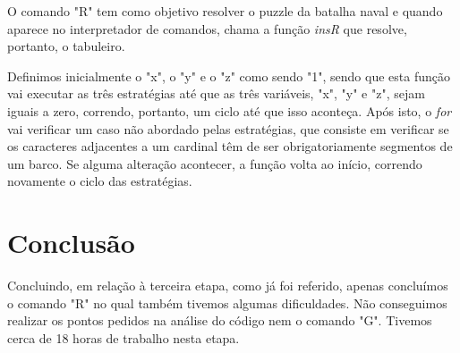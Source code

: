 \documentclass[12pt,a4paper,portuges]{article}
\begin{document}
O comando "R" tem como objetivo resolver o puzzle da batalha naval e quando aparece no interpretador de comandos, chama a função \textit{insR} que resolve, portanto, o tabuleiro.

Definimos inicialmente o "x", o "y" e o "z" como sendo "1", sendo que esta função vai executar as três estratégias até que as três variáveis, "x", "y" e "z", sejam iguais a zero, correndo, portanto, um ciclo até que isso aconteça. Após isto, o \textit{for} vai verificar um caso não abordado pelas estratégias, que consiste em verificar se os caracteres adjacentes a um cardinal têm de ser obrigatoriamente segmentos de um barco. Se alguma alteração acontecer, a função volta ao início, correndo novamente o ciclo das estratégias. 

\newpage

\section{\textbf{Conclusão}}

Concluindo, em relação à terceira etapa, como já foi referido, apenas concluímos o comando "R" no qual também tivemos algumas dificuldades. Não conseguimos realizar os pontos pedidos na análise do código nem o comando "G". Tivemos cerca de 18 horas de trabalho nesta etapa.
\end{document}
